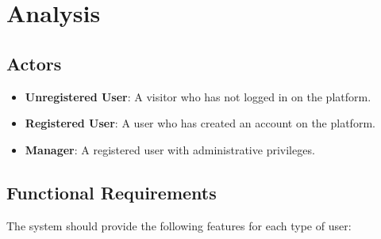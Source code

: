 \chapter{Analysis}

\section{Actors}

\begin{itemize}
    \item \textbf{Unregistered User}: A visitor who has not logged in on the platform.
    
    \item \textbf{Registered User}: A user who has created an account on the platform.
    
    \item \textbf{Manager}: A registered user with administrative privileges.
\end{itemize}

\section{Functional Requirements}

The system should provide the following features for each type of user:

